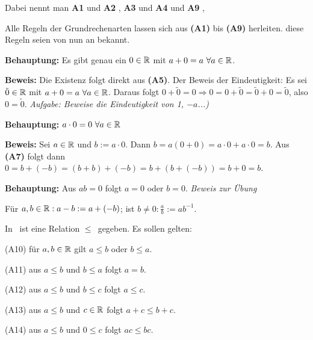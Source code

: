 \documentclass[a4paper,twoside,DIV15,BCOR12mm]{scrbook}
\begin{document}
Dabei nennt man \textbf{A1} und \textbf{A2} , \textbf{A3} und \textbf{A4}  und \textbf{A9} , 

Alle Regeln der Grundrechenarten lassen sich aus \textbf{(A1)} bis \textbf{(A9)} herleiten. diese Regeln seien von nun an bekannt.

\begin{beispiele}
\item \textbf{Behauptung:} Es gibt genau ein $0 \in \mathbb{R}$ mit $a+0 = a \ \forall a\in \mathbb{R}$.

\textbf{Beweis:} Die Existenz folgt direkt aus \textbf{(A5)}. Der Beweis der Eindeutigkeit: Es sei $\tilde 0 \in \mathbb{R}$ mit $a+0 = a \ \forall a \in \mathbb{R}$. Daraus folgt $0 + \tilde 0 = 0 \Rightarrow 0 = 0 + \tilde 0 = \tilde 0 + 0 = \tilde 0$, also $0 = \tilde 0$. \textit{Aufgabe: Beweise die Eindeutigkeit von 1, $-a$...)}

\item \textbf{Behauptung:} $a \cdot 0 = 0 \ \forall a \in \mathbb{R}$

\textbf{Beweis:} Sei $a\in\mathbb{R}$ und $b := a \cdot 0$. Dann $b = a(0+0) = a \cdot 0 + a \cdot 0 = b$. Aus \textbf{(A7)} folgt dann $0 = b + (-b) = (b+b)+(-b) = b + (b+ (-b)) = b + 0  =b$.

\item

\textbf{Behauptung:} Aus $ab= 0$ folgt $a = 0$ oder $b=0$. \textit{Beweis zur Übung}

\end{beispiele}

\begin{schreibweisen}
Für $a,b \in\mathbb{R}: a - b := a+ (-b)$; ist $b \neq 0: \frac{a}{b} := ab^{-1}$.
\end{schreibweisen}

\begin{axiom}[Anordnungsaxiome]
In \MdR\ ist eine Relation \glqq$\le$\grqq\ gegeben. Es sollen gelten:
\begin{liste}
\item[(A10)] für $a,b\in\mathbb{R}$ gilt $a\le b$ oder $b \le a$.
\item[(A11)] aus $a \le b$ und $b \le a $ folgt $a = b$.
\item[(A12)] aus $a \le b$ und $b \le c $ folgt $a \le c$.
\item[(A13)] aus $a \le b$ und $c \in \mathbb{R}$ folgt $a+c \le b+c$.
\item[(A14)] aus $a \le b$ und $0 \le c$ folgt $ac \le bc$.
\end{liste}
\end{axiom}
\end{document}
